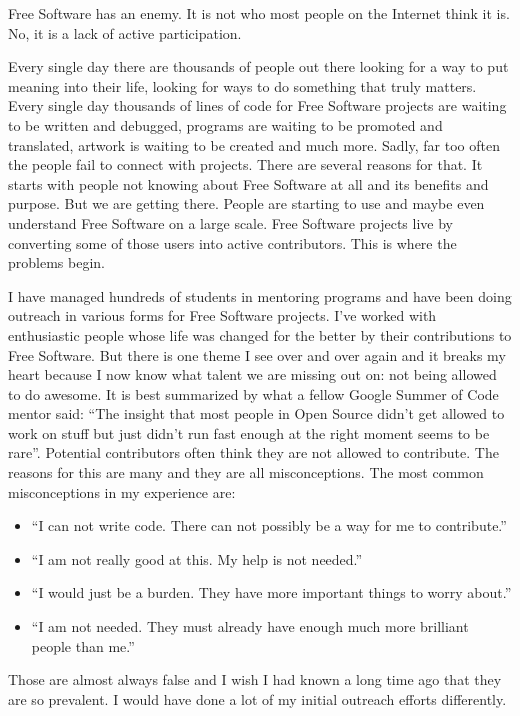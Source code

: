 

\noindent{}Free Software has an enemy. It is not who most people on the Internet think it
is. No, it is a lack of active participation.

Every single day there are thousands of people out there looking for a way to
put meaning into their life, looking for ways to do something that truly
matters. Every single day thousands of lines of code for Free Software projects
are waiting to be written and debugged, programs are waiting to be promoted and
translated, artwork is waiting to be created and much more. Sadly, far too often
the people fail to connect with projects. There are several reasons for
that. It starts with people not knowing about Free Software at all and its
benefits and purpose. But we are getting there. People are starting to use and
maybe even understand Free Software on a large scale. Free Software projects
live by converting some of those users into active contributors. This is where
the problems begin.

I have managed hundreds of students in mentoring programs and have been doing
outreach in various forms for Free Software projects. I've worked with
enthusiastic people whose life was changed for the better by their contributions
to Free Software. But there is one theme I see over and over again and it breaks
my heart because I now know what talent we are missing out on: not being allowed
to do awesome. It is best summarized by what a fellow Google Summer of Code
mentor said: ``The insight that most people in Open Source didn’t get allowed to
work on stuff but just didn’t run fast enough at the right moment seems to be
rare''. Potential contributors often think they are not allowed to contribute.
The reasons for this are many and they are all misconceptions. The most common
misconceptions in my experience are:
\begin{itemize}
 \item ``I can not write code. There can not possibly be a way for me to
contribute.''
 \item ``I am not really good at this. My help is not needed.''
 \item ``I would just be a burden. They have more important things to worry
about.''
 \item ``I am not needed. They must already have enough much more brilliant
people than me.''
\end{itemize}
Those are almost always false and I wish I had known a long time ago that they
are so prevalent. I would have done a lot of my initial outreach efforts
differently.

